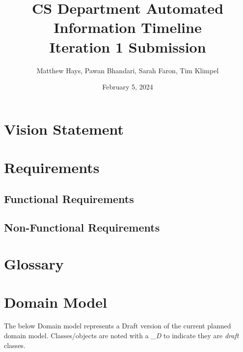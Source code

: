 \documentclass{article}
\title{CS Department Automated Information Timeline \\ Iteration 1 Submission}
\date{February 5, 2024}
\author{Matthew Hays, Pawan Bhandari, Sarah Faron, Tim Klimpel}
\begin{document}
\maketitle
\newpage
\tableofcontents
\listoffigures
\newpage
\section{Vision Statement}

\section{Requirements}
\subsection{Functional Requirements}



\subsection{Non-Functional Requirements}



\section{Glossary}



\section{Domain Model}

The below Domain model represents a Draft version of the current planned domain model.  Classes/objects are noted with a \textit{\_D} to indicate they are \textit{draft} classes.
\end{document}

